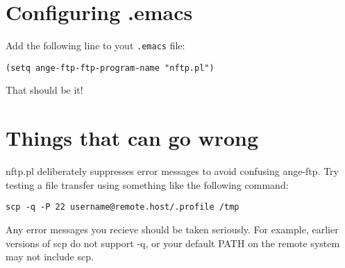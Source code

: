 \section{Configuring .emacs}

Add the following line to yout {\tt .emacs} file:
\begin{verbatim}
(setq ange-ftp-ftp-program-name "nftp.pl")
\end{verbatim}

That should be it!

\section{Things that can go wrong}

nftp.pl deliberately suppresses error messages to avoid confusing
ange-ftp. Try testing a file transfer using something like the
following command:
\begin{verbatim}
scp -q -P 22 username@remote.host/.profile /tmp
\end{verbatim}
Any error messages you recieve should be taken seriously. For example,
earlier versions of scp do not support -q, or your default PATH on the
remote system may not include scp.


